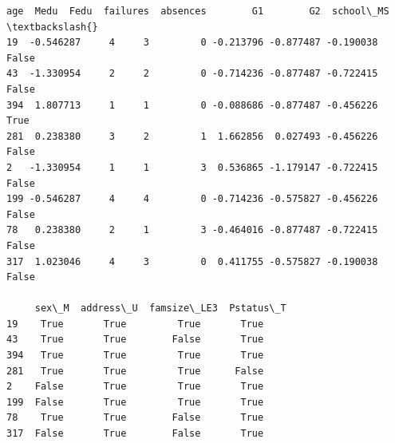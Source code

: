 \documentclass[9pt]{article}
\makeatletter
\newcommand{\boxspacing}{\kern\kvtcb@left@rule\kern\kvtcb@boxsep}
\newcommand{\prompt}[4]{
        {\ttfamily\llap{{\color{#2}[#3]:\hspace{3pt}#4}}\vspace{-\baselineskip}}
    }
\makeatother
\begin{document}
            \begin{tcolorbox}[breakable, size=fbox, boxrule=.5pt, pad at break*=1mm, opacityfill=0]
\prompt{Out}{outcolor}{22}{\boxspacing}
\begin{Verbatim}[commandchars=\\\{\}]
          age  Medu  Fedu  failures  absences        G1        G2  school\_MS  \textbackslash{}
19  -0.546287     4     3         0 -0.213796 -0.877487 -0.190038      False
43  -1.330954     2     2         0 -0.714236 -0.877487 -0.722415      False
394  1.807713     1     1         0 -0.088686 -0.877487 -0.456226       True
281  0.238380     3     2         1  1.662856  0.027493 -0.456226      False
2   -1.330954     1     1         3  0.536865 -1.179147 -0.722415      False
199 -0.546287     4     4         0 -0.714236 -0.575827 -0.456226      False
78   0.238380     2     1         3 -0.464016 -0.877487 -0.722415      False
317  1.023046     4     3         0  0.411755 -0.575827 -0.190038      False

     sex\_M  address\_U  famsize\_LE3  Pstatus\_T
19    True       True         True       True
43    True       True        False       True
394   True       True         True       True
281   True       True         True      False
2    False       True         True       True
199  False       True         True       True
78    True       True        False       True
317  False       True        False       True
\end{Verbatim}
\end{tcolorbox}
        
\end{document}
